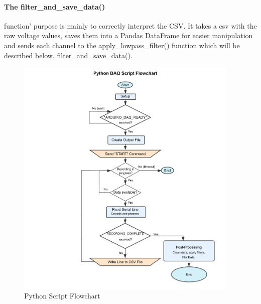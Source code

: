 \paragraph{The filter\_and\_save\_data()} function' purpose is mainly to correctly interpret the CSV. It takes a csv with the raw voltage values, saves them into a Pandas DataFrame for easier manipulation and sends each channel to the apply\_lowpass\_filter() function which will be described below. filter\_and\_save\_data().

\begin{figure}[ptb] 
  \centering
  \includegraphics[width=0.95\textwidth]{chapters/methodology/ArduinoDAQ/python_serial_receive.jpg}
  \caption{Python Script Flowchart}
  \label{fig:pythonFlowchart}
\end{figure}

